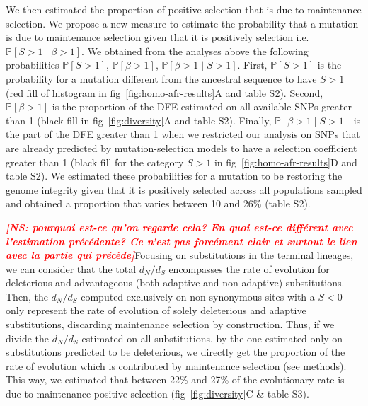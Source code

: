 \documentclass{article}
\newcommand{\NS}[1]{\textcolor{red}{\textbf{\emph{[NS: #1]}}}}
\newcommand{\dn}{d_N}
\newcommand{\ds}{d_S}
\newcommand{\dnds}{\dn / \ds}
\newcommand{\Sphy}{S}
\newcommand{\given}{\mid}
\newcommand{\Spop}{\beta}
\begin{document}
    We then estimated the proportion of positive selection that is due to maintenance selection.
    We propose a new measure to estimate the probability that a mutation is due to maintenance selection given that it is positively selection i.e. $\mathbb{P} [ \Sphy > 1  \given  \Spop > 1]$.
    We obtained from the analyses above the following probabilities $\mathbb{P} [ \Sphy > 1 ]$, $\mathbb{P} [ \Spop > 1 ]$, $\mathbb{P} [ \Spop > 1  \given  \Sphy > 1]$.
    First, $\mathbb{P} [ \Sphy > 1 ]$ is the probability for a mutation different from the ancestral sequence to have $\Sphy > 1$ (red fill of histogram in fig~\ref{fig:homo-afr-results}A and table S2).
    Second, $\mathbb{P} [ \Spop > 1 ]$ is the proportion of the DFE estimated on all available SNPs greater than 1 (black fill in fig~\ref{fig:diversity}A and table S2).
    Finally, $\mathbb{P} [ \Spop > 1  \given  \Sphy > 1]$ is the part of the DFE greater than 1 when we restricted our analysis on SNPs that are already predicted by mutation-selection models to have a selection coefficient greater than 1 (black fill for the category $\Sphy > 1$ in fig~\ref{fig:homo-afr-results}D and table S2).
    We estimated these probabilities for a mutation to be restoring the genome integrity given that it is positively selected across all populations sampled and obtained a proportion that varies between 10 and 26\% (table S2).

    \NS{pourquoi est-ce qu'on regarde cela? En quoi est-ce différent avec l'estimation précédente? Ce n'est pas forcément clair et surtout le lien avec la partie qui précède}Focusing on substitutions in the terminal lineages, we can consider that the total $\dnds$ encompasses the rate of evolution for deleterious and advantageous (both adaptive and non-adaptive) substitutions.
    Then, the $\dnds$ computed exclusively on non-synonymous sites with a $\Sphy < 0$ only represent the rate of evolution of solely deleterious and adaptive substitutions, discarding maintenance selection by construction.
    Thus, if we divide the $\dnds$ estimated on all substitutions, by the one estimated only on substitutions predicted to be deleterious, we directly get the proportion of the rate of evolution which is contributed by maintenance selection (see methods).
    This way, we estimated that between 22\% and 27\% of the evolutionary rate is due to maintenance positive selection (fig~\ref{fig:diversity}C \& table S3).
\end{document}
